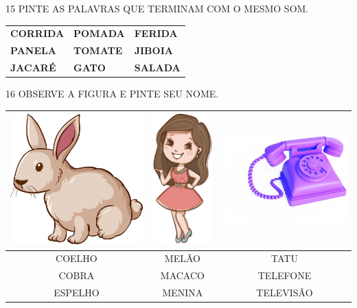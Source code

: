 \num{15} PINTE AS PALAVRAS QUE TERMINAM COM O MESMO SOM.

\begin{longtable}[]{@{}lll@{}}
\toprule
\textbf{CORRIDA} & \textbf{POMADA} & \textbf{FERIDA}\tabularnewline
\textbf{PANELA} & \textbf{TOMATE} & \textbf{JIBOIA}\tabularnewline
\textbf{JACARÉ} & \textbf{GATO} & \textbf{SALADA}\tabularnewline
\bottomrule
\end{longtable}

\num{16} OBSERVE A FIGURA E PINTE SEU NOME.

\begin{center}
\begin{tabular}{ccc}
\multicolumn{1}{l}{\includegraphics[width=.2\textwidth]{media/image70.png}} & \multicolumn{1}{l}{\includegraphics[width=.2\textwidth]{media/image72.png} } & \multicolumn{1}{l}{\includegraphics[width=.2\textwidth]{media/image73.png}} \\ \hline
\multicolumn{1}{|c|}{COELHO} & \multicolumn{1}{c|}{MELÃO} & \multicolumn{1}{c|}{TATU} \\ \hline
\multicolumn{1}{|c|}{COBRA} & \multicolumn{1}{c|}{MACACO} & \multicolumn{1}{c|}{TELEFONE} \\ \hline
\multicolumn{1}{|c|}{ESPELHO} & \multicolumn{1}{c|}{MENINA} & \multicolumn{1}{c|}{TELEVISÃO} \\ \hline
\end{tabular}
\end{center}

